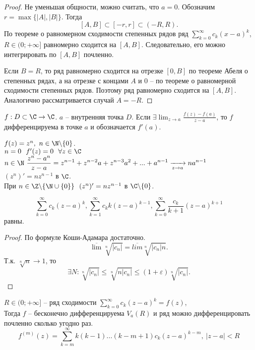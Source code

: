\begin{proof}
	Не уменьшая общности, можно считать, что $a = 0$. Обозначим $r = \max \{ |A|, |B| \}$. Тогда 
	\[ [A, B] \subset [-r, r] \subset (-R, R).\]
	По теореме о равномерном сходимости степенных рядов ряд $\displaystyle \sum_{k = 0}^{\infty} c_k (x-a)^k$, $R \in (0; + \infty]$ равномерно сходится на $[A, B]$. Следовательно, его можно интегрировать по $[A, B]$ почленно.
	
	Если $B = R$, то ряд равномерно сходится на отрезке $[0, B]$ по теореме Абеля о степенных рядах, а на отрезке с концами $A$ и $0$ -- по теореме о равномерной сходимости степенных рядов. Поэтому ряд равномерно сходится на $[A, B]$. Аналогично рассматривается случай $A = -R$. 
\end{proof}

\begin{Def}
    $f: D \subset \C \to \C$. $a$ -- внутренняя точка $D$.
    Если $\exists \displaystyle \lim_{z \to a}\frac{f(z) - f(a)}{z - a}$, то  $f$ дифференцируема в точке $a$  и обозначается $f'(a)$.
\end{Def}

\begin{Example}
	$f(z) = z^n, \ n \in \N \backslash \{0\}$.\\
	$n = 0 \ \ f'(z) = 0 \ \ \forall z \in \C$ \\
	$n \in \N \ \displaystyle \frac{z^n - a^n}{z - a} = z^{n - 1} + z^{n -2}a + z^{n - 3}a^2 + ... + a^{n - 1} \xrightarrow[z \to a]{} n a^{n - 1}$ \\
	$(z^n)' = n z^{n - 1}$ в $\C$.\\
	При $n \in \Z \backslash \{ \N \cup \{ 0\}\} \ \ (z^n)' = nz^{n-1}$ в $\C \backslash \{0\}$.
\end{Example}

\begin{Lm}
	$$\sum_{k = 0}^{\infty} c_k  (z - a)^k, \sum_{k = 1}^{\infty}c_k k (z - a)^{k-1}, \sum_{k = 0}^{\infty} \frac{c_k}{k + 1} (z - a)^{k+1} $$ равны.
\end{Lm}

\begin{proof}
	По формуле Коши-Адамара достаточно.
    $$\overline{\lim} \sqrt[n]{|c_n|} = \overline{lim} \sqrt[n]{|c_n| n}.$$
	Т.к. $\sqrt[n]{n} \to 1$, то $$\exists N: \sqrt[n]{|c_n|} \leqslant \sqrt[n]{n|c_n|} \leqslant (1 + \varepsilon) \sqrt[n]{|c_n|}.$$
\end{proof}

\begin{Thm}
	$R \in (0; + \infty]$ -- ряд сходимости $\displaystyle\sum_{k = 0}^{\infty} c_k (z-a)^k = f(z)$, \\
	Тогда $f$ -- бесконечно дифференцируема $V_a (R)$  и ряд можно дифференцировать почленно сколько угодно раз.
	$$f^{(m)} (z) = \sum_{k = m}^{\infty} k(k-1)...(k-m+1) c_k (z-a)^{k - m}, \ |z - a| < R$$ 
\end{Thm}

